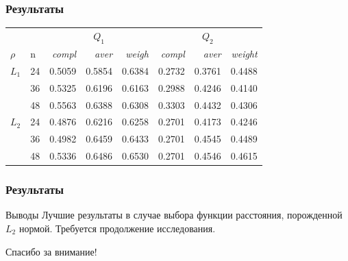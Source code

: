 \documentclass{beamer}
\begin{document}

\begin{frame}
    \frametitle{Результаты}   
    \begin{center}
        \begin{table}
        \begin{tabular}{ll|rrr|rrr}  
            \toprule
            & & \multicolumn{3}{c|}{$Q_1$} & \multicolumn{3}{c}{$Q_2$} \\
            \cmidrule(r){3-8}
        $\rho$ & n & \textit{compl} & \textit{aver} & \textit{weigh} & \textit{compl} & \textit{aver} & \textit{weight} \\
            \midrule
        $L_1$   & 24    &   0.5059  &   0.5854 &    0.6384  & 0.2732   &  0.3761    &   0.4488  \\
                & 36    &   0.5325  &   0.6196 &    0.6163  & 0.2988   &  0.4246    &   0.4140  \\
                & 48    &   0.5563  &   0.6388 &    0.6308  & 0.3303   &  0.4432    &   0.4306  \\
        $L_2$   & 24    &   0.4876  &   0.6216 &    0.6258  & 0.2701   &  0.4173    &   0.4246  \\
                & 36    &   0.4982  &   0.6459 &    0.6433  & 0.2701   &  0.4545    &   0.4489  \\
                & 48    &   0.5336  &   0.6486 &    0.6530  & 0.2701   &  0.4546    &   0.4615  \\
        \bottomrule
        \end{tabular}
        \end{table}
    \end{center}
\end{frame}


\begin{frame}
    \frametitle{Результаты}
    \begin{block}{Выводы}
        Лучшие результаты в случае выбора функции расстояния, порожденной $L_2$ нормой.
        Требуется продолжение исследования.
    \end{block}
\end{frame}
    
\begin{frame}
    \begin{center}
        \Huge Спасибо за внимание!
    \end{center}
\end{frame}

\end{document}
